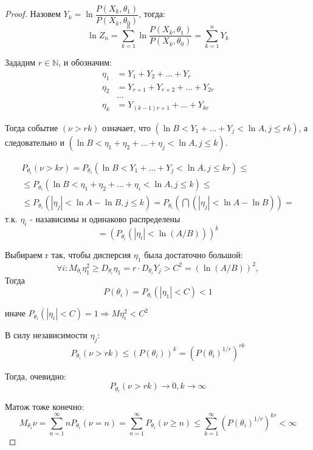 \begin{proof}
  Назовем $Y_k = \ln \dfrac{P(X_k, \theta_1)}{P(X_k, \theta_0)}$, тогда:
  \[
    \ln Z_n = \sum_{k=1}^n \ln \dfrac{P(X_k, \theta_1)}{P(X_k, \theta_0)} = \sum_{k=1}^n Y_k
  \]

  Зададим $r \in \mathbb{N}$, и обозначим:
  \begin{align*}
    \eta_1 &= Y_1 + Y_2 + \dots + Y_r \\
    \eta_2 &= Y_{r+1} + Y_{r+2} + \dots + Y_{2r} \\
           &\dots \\
    \eta_k &= Y_{(k-1) r + 1} + \dots + Y_{kr}
  \end{align*}

  Тогда событие $(\nu > rk)$ означает, что $(\ln B < Y_1 + \dots + Y_j < \ln A, j \leqslant rk)$, а следовательно и $(\ln B < \eta_1 + \eta_2 + \dots + \eta_j < \ln A, j \leqslant k)$.

  \begin{multline*}
    P_{\theta_i} (\nu > kr)
    = P_{\theta_i} (\ln B < Y_1 + \dots + Y_j < \ln A, j \leqslant kr) \leqslant \\
    \leqslant P_{\theta_i} (\ln B < \eta_1 + \eta_2 + \dots + \eta_i < \ln A, j \leqslant k) \leqslant \\
    \leqslant P_{\theta_i} (|\eta_j| < \ln A - \ln B, j \leqslant k)
    = P_{\theta_i} \left(\bigcap (|\eta_j| < \ln A - \ln B)\right) =
  \end{multline*}
  т.к. $\eta_i$ - назависимы и одинаково распределены \\
  \[
    = (P_{\theta_i} (|\eta_i| < \ln (A/B)))^k
  \]

  Выбираем r так, чтобы дисперсия $\eta_1$ была достаточно большой:
  \[
    \forall i : M_{\theta_i} \eta_1^2 \geqslant D_{\theta_i} \eta_1
    = r \cdot D_{\theta_i} Y_j > C^2 = (\ln (A/B))^2,
  \]
  Тогда
  \[
    P(\theta_i) = P_{\theta_i} (|\eta_1| < C) < 1
  \]

  иначе $P_{\theta_i} (|\eta_i| < C) = 1 \Rightarrow M \eta_i^2 < C^2$

  В силу независимости $\eta_j$:
  \[
    P_{\theta_i} (\nu > rk) \leqslant (P(\theta_i))^k = (P(\theta_i)^{1/r})^{rk}
  \]

  Тогда, очевидно:
  \[
    P_{\theta_i} (\nu > rk) \to 0, k \to \infty
  \]
  
  Матож тоже конечно:
  \[
    M_{\theta_i} \nu
    = \sum_{n=1}^{\infty} n P_{\theta_i} (\nu  = n)
    = \sum_{n=1}^{\infty} P_{\theta_i} (\nu \geqslant n)
    \leqslant \sum_{k=1}^{\infty} ( P(\theta_i)^{1/r} )^{kr}
    < \infty
\]

\end{proof}

